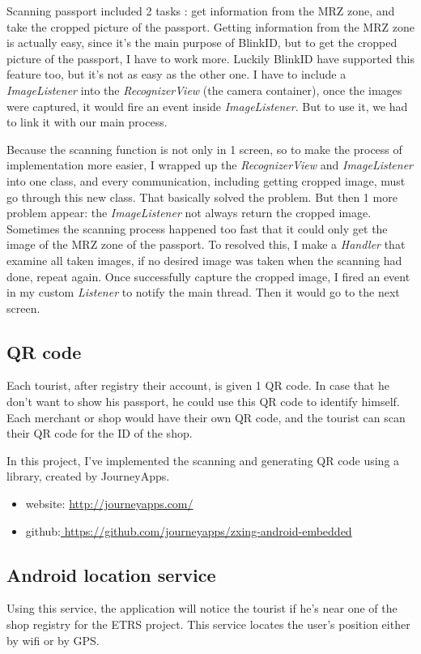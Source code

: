 Scanning passport included 2 tasks : get information from the MRZ zone, and take the cropped picture of the passport. Getting information from the MRZ zone is actually easy, since it's the main purpose of BlinkID, but to get the cropped picture of the passport, I have to work more. Luckily BlinkID have supported this feature too, but it's not as easy as the other one. I have to include a \textit{ImageListener} into the \textit{RecognizerView} (the camera container), once the images were captured, it would fire an event inside \textit{ImageListener}. But to use it, we had to link it with our main process. 

Because the scanning function is not only in 1 screen, so to make the process of implementation more easier, I wrapped up the \textit{RecognizerView} and \textit{ImageListener} into one class, and every communication, including getting cropped image, must  go through this new class. That basically solved the problem. But then 1 more problem appear: the \textit{ImageListener} not always return the cropped image. Sometimes the scanning process happened too fast that it could only get the image of the MRZ zone of the passport. To resolved this, I make a \textit{Handler} that examine all taken images, if no desired image was taken when the scanning had done, repeat again. Once successfully capture the cropped image, I fired an event in my custom \textit{Listener} to notify the main thread. Then it would go to the next screen.


\subsection{QR code}
Each tourist, after registry their account, is given 1 QR code. In case that he don't want to show his passport, he could use this QR code to identify himself. Each merchant or shop would have their own QR code, and the tourist can scan their QR code for the ID of the shop. 

In this project, I've implemented the scanning and generating QR code using a library, created by JourneyApps.
\begin{itemize}
	\item website: \href{http://journeyapps.com/}{http://journeyapps.com/}
	\item github:\href{https://github.com/journeyapps/zxing-android-embedded}{ https://github.com/journeyapps/zxing-android-embedded}
\end{itemize}

\subsection{Android location service}
Using this service, the application will notice the tourist if he's near one of the shop registry for the ETRS project. This service locates the user's position either by wifi or by GPS.

